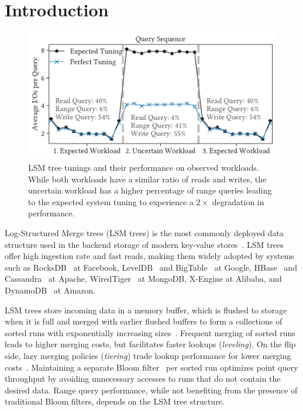 
\section{Introduction}
\label{sec:introduction}

\begin{figure}[t]
    \centering
    \includegraphics[scale=0.5]{figures/introduction_sequence.pdf}
    \caption{LSM tree tunings and their performance on observed workloads. While
        both workloads have a similar ratio of reads and writes, the uncertain
        workload has a higher percentage of range queries leading to the
        expected system tuning to experience a $2\times$ degradation in
        performance.}
    \label{fig:introduction_query_seq}
\end{figure}

Log-Structured Merge trees (LSM trees) is the most commonly deployed data structure
used in the backend storage of modern key-value stores~\cite{ONeil1996}.
LSM trees offer high ingestion rate and fast reads,
    making them widely adopted by systems such as RocksDB~\cite{FacebookRocksDB} 
    at Facebook, LevelDB~\cite{GoogleLevelDB} and BigTable~\cite{Chang2006} at 
    Google, HBase~\cite{HBase2013} and Cassandra~\cite{ApacheCassandra} at 
    Apache, WiredTiger~\cite{WiredTiger} at MongoDB, X-Engine \cite{Huang2019} 
    at Alibaba, and DynamoDB~\cite{DeCandia2007} at Amazon.
           
LSM trees store incoming data in a memory buffer, which 
    is flushed to storage when it is full and merged with
    earlier flushed buffers to form a collections of sorted runs 
    with exponentially increasing sizes~\cite{Luo2020b}. 
Frequent merging of sorted runs leads to higher merging costs, but facilitates
    faster lookups (\emph{leveling}).
On the flip side, lazy merging policies (\emph{tiering}) trade lookup 
    performance for lower merging costs~\cite{Sarkar2021c}.
Maintaining a separate Bloom filter~\cite{Bloom1970} per sorted run 
    optimizes point query throughput by avoiding unnecessary accesses to runs 
    that do not contain the desired data.
Range query performance, while not benefiting from the presence of traditional 
    Bloom filters, depends on the LSM tree structure.  
   
